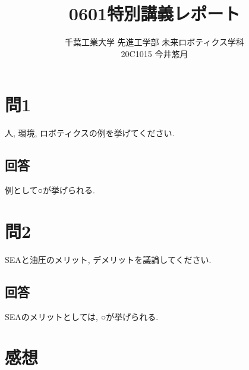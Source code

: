 \documentclass{jsarticle}
\begin{document}
\title{{\vspace*{-30mm}}{\LARGE 0601特別講義レポート}}
\author{\large 千葉工業大学 先進工学部 未来ロボティクス学科 \vspace*{4mm}\\20C1015 今井悠月}
\date{}
\maketitle\vspace*{10mm}

\section*{問1}
人, 環境, ロボティクスの例を挙げてください.

\subsection*{回答}
例として○が挙げられる.

\vspace*{10mm}

\section*{問2}
SEAと油圧のメリット, デメリットを議論してください.

\subsection*{回答}
SEAのメリットとしては, ○が挙げられる.

\section*{感想}
\end{document}
